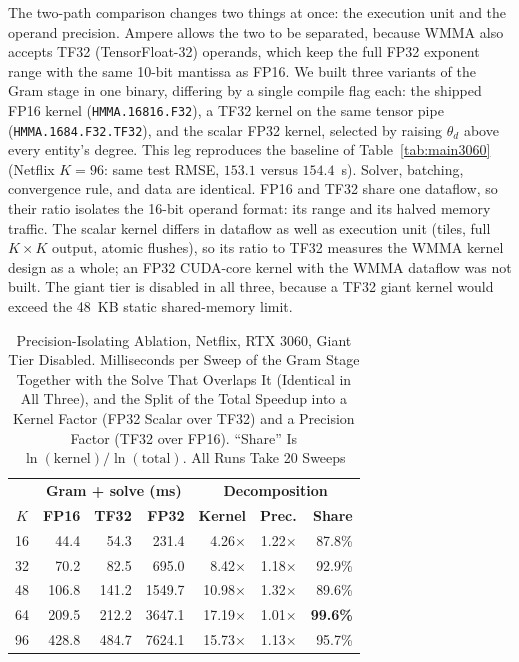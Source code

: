 The two-path comparison changes two things at once: the execution unit and the operand precision. Ampere allows the two to be separated, because WMMA also accepts TF32 (TensorFloat-32) operands, which keep the full FP32 exponent range with the same 10-bit mantissa as FP16. We built three variants of the Gram stage in one binary, differing by a single compile flag each: the shipped FP16 kernel (\texttt{HMMA.16816.F32}), a TF32 kernel on the same tensor pipe (\texttt{HMMA.1684.F32.TF32}), and the scalar FP32 kernel, selected by raising $\theta_d$ above every entity's degree. This leg reproduces the baseline of Table~\ref{tab:main3060} (Netflix $K=96$: same test RMSE, $153.1$ versus $154.4$~s). Solver, batching, convergence rule, and data are identical. FP16 and TF32 share one dataflow, so their ratio isolates the 16-bit operand format: its range and its halved memory traffic. The scalar kernel differs in dataflow as well as execution unit (tiles, full $K \times K$ output, atomic flushes), so its ratio to TF32 measures the WMMA kernel design as a whole; an FP32 CUDA-core kernel with the WMMA dataflow was not built. The giant tier is disabled in all three, because a TF32 giant kernel would exceed the 48~KB static shared-memory limit.
\begin{table}[!t]
\caption{Precision-Isolating Ablation, Netflix, RTX 3060, Giant Tier Disabled. Milliseconds per Sweep of the Gram Stage Together with the Solve That Overlaps It (Identical in All Three), and the Split of the Total Speedup into a Kernel Factor (FP32 Scalar over TF32) and a Precision Factor (TF32 over FP16). ``Share'' Is $\ln(\text{kernel})/\ln(\text{total})$. All Runs Take 20 Sweeps}
\label{tab:precisioniso}
\centering
\footnotesize
\renewcommand{\arraystretch}{1.05}
\setlength{\tabcolsep}{3pt}
\begin{tabular}{crrrrrr}
\toprule
 & \multicolumn{3}{c}{\textbf{Gram + solve (ms)}} & \multicolumn{3}{c}{\textbf{Decomposition}} \\
\textbf{$K$} & \textbf{FP16} & \textbf{TF32} & \textbf{FP32} & \textbf{Kernel} & \textbf{Prec.} & \textbf{Share} \\
\midrule
16 & 44.4  & 54.3  & 231.4   & 4.26$\times$  & 1.22$\times$ & 87.8\% \\
32 & 70.2  & 82.5  & 695.0   & 8.42$\times$  & 1.18$\times$ & 92.9\% \\
48 & 106.8 & 141.2 & 1549.7  & 10.98$\times$ & 1.32$\times$ & 89.6\% \\
64 & 209.5 & 212.2 & 3647.1  & 17.19$\times$ & 1.01$\times$ & \textbf{99.6\%} \\
96 & 428.8 & 484.7 & 7624.1  & 15.73$\times$ & 1.13$\times$ & 95.7\% \\
\bottomrule
\end{tabular}
\end{table}

